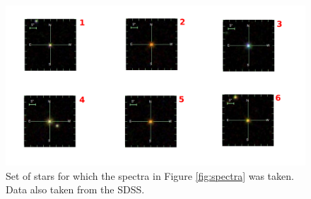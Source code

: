 \documentclass{tufte-handout}
\begin{document}
\begin{fullwidth}
\begin{figure}
  \includegraphics[width=1.5\columnwidth]{figures_activity1/stars1.pdf}
  \caption{Set of stars for which the spectra in Figure \ref{fig:spectra} was taken. Data also taken from the SDSS.}
  \label{fig:stars}
\end{figure}

\end{fullwidth}


\end{document}
